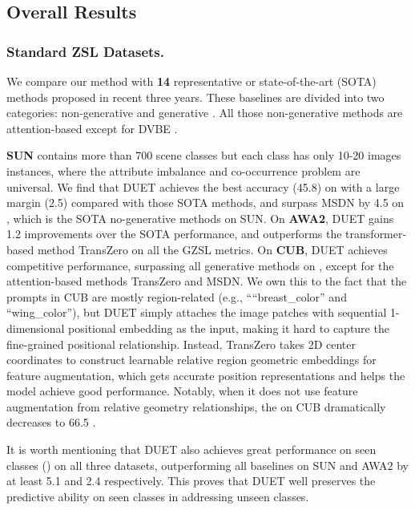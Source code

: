 \documentclass[letterpaper]{article} \usepackage{aaai23}  \usepackage{times}  \usepackage{helvet}  \usepackage{courier}  \usepackage[hyphens]{url}  \usepackage{graphicx} \urlstyle{rm} \def\UrlFont{\rm}  \usepackage{natbib}  \usepackage{caption} \frenchspacing  \setlength{\pdfpagewidth}{8.5in}  \setlength{\pdfpageheight}{11in}  \usepackage{algorithm}
\newcommand{\fy}[1]{{\color{black}#1}}
\newcommand{\gyx}[1]{{\color{black}#1}}
\begin{document}
\subsection{Overall Results}
\subsubsection{\textbf{Standard ZSL Datasets.}}
We compare our method with \textbf{14} representative {or state-of-the-art (SOTA) methods proposed in recent three years.}
{These baselines are divided into two \gyx{categories}:}
non-generative \cite{DBLP:conf/nips/XuXWSA20,DBLP:conf/cvpr/MinYXWZZ20,DBLP:conf/cvpr/HuynhE20,DBLP:conf/eccv/Xie0ZZZYQ020,DBLP:conf/cvpr/Liu00H00H21,Chen2022MSDN,Chen2021TransZero} and generative \cite{DBLP:conf/eccv/NarayanGKSS20,DBLP:conf/nips/HuynhE20,DBLP:conf/cvpr/HanF0021,DBLP:conf/cvpr/YueWS0Z21,DBLP:conf/iccv/0002WXPYZ021,Chen2021HSVA,DBLP:conf/iclr/ChouLL21}.
All those non-generative methods are attention-based except {for} DVBE \cite{DBLP:conf/cvpr/MinYXWZZ20}.

\textbf{SUN} contains more than 700 scene classes but each class has {only 10-20 images instances, where the attribute} imbalance and co-occurrence problem are universal.
We find that DUET achieves the best accuracy (45.8) \fy{on}  with a large margin (2.5) compared with those SOTA methods, and surpass MSDN by 4.5 on , which is the SOTA no-generative methods on SUN.
{On \textbf{AWA2}, DUET gains 1.2 improvements over the SOTA performance}, and outperforms the transformer-based method TransZero  \fy{on} all {the} GZSL metrics.
{On \textbf{CUB},} DUET achieves competitive performance\fy{, surpassing all generative methods on , {except for the attention-based methods} TransZero and MSDN.}
We own this to the fact that the prompts in CUB are mostly region-related (e.g., ````breast\_color'' and ``wing\_color''),  but DUET simply 
{attaches} the image patches with sequential 1-dimensional positional embedding as the input, {making it hard to capture} the fine-grained positional relationship.
Instead, TransZero {takes}
2D  center coordinates to construct learnable relative region \fy{geometric} embeddings for feature augmentation, which gets accurate position representations and {helps
the model achieve good performance}.  
{Notably, when it does not use} feature augmentation from relative geometry relationships, the  on CUB dramatically decreases to 66.5 \cite{Chen2021TransZero}.

{It is worth mentioning that DUET also achieves great performance on  seen classes () on all three datasets, \fy{outperforming} all baselines on SUN and AWA2 by at least 5.1 and 2.4 respectively.
This \fy{proves} that DUET well preserves the predictive ability {on} seen class\fy{es} in addressing unseen classes.}
\end{document}

